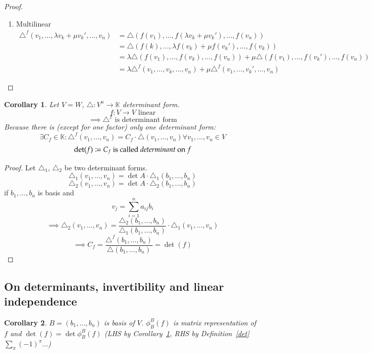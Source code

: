 \documentclass{article}
\newtheorem*{corollary}{Corollary}%
\begin{document}
\begin{proof}
  \begin{enumerate}
  	\item Multilinear
  		\begin{align*}
  		  \triangle^f (v_1, \dots, \lambda v_k + \mu v_k', \dots, v_n) &= \triangle (f(v_1), \dots, f(\lambda v_k + \mu v_k'), \dots, f(v_n)) \\
  		  	&= \triangle(f(k), \dots, \lambda f(v_k) + \mu f(v_k'), \dots, f(v_k)) \\
  		  	&= \lambda \triangle (f(v_1), \dots, f(v_k), \dots, f(v_n)) + \mu \triangle(f(v_1), \dots, f(v_k'), \dots, f(v_n)) \\
  		  	&= \lambda \triangle^f(v_1, \dots, v_k, \dots, v_n) + \mu \triangle^f (v_1, \dots, v_k', \dots, v_n)
  		\end{align*}
  \end{enumerate}
\end{proof}

\begin{corollary} %
  \label{cor726}
  Let $V = W$, $\triangle: V^n \to \mathbb K$ determinant form.
  \[ f: V \to V \text{ linear} \]
  \[ \implies \triangle^f \text{ is determinant form} \]
  Because there is (except for one factor) only one determinant form:
  \[ \exists C_f \in \mathbb K: \triangle^f(v_1, \dots, v_n) = C_f \cdot \triangle(v_1, \dots, v_n) \forall v_1,\dots,v_n \in V \]
  \[ \det(f) \coloneqq C_f \text{ is called \emph{determinant} on } f \]
\end{corollary}

\begin{proof}
  Let $\triangle_1$, $\triangle_2$ be two determinant forms.
  \[ \triangle_1 (v_1, \dots, v_n) = \det{A} \cdot \triangle_1(b_1, \dots, b_n) \]
  \[ \triangle_2 (v_1, \dots, v_n) = \det{A} \cdot \triangle_2(b_1, \dots, b_n) \]
  if $b_1, \dots, b_n$ is basis and
  \[ v_j = \sum_{i=1}^n a_{ij} b_i \]
  \[ \implies \triangle_2(v_1, \dots, v_n) = \frac{\triangle_2(b_1, \dots, b_n)}{\triangle_1(b_1, \dots, b_n)} \cdot \triangle_1(v_1, \dots, v_n) \]
  \[ \implies C_f = \frac{\triangle^f(b_1, \dots, b_n)}{\triangle (b_1, \dots, b_n)} = \det(f) \]
\end{proof}

\subsection{On determinants, invertibility and linear independence}

\begin{corollary} %
  $B = (b_1, \dots, b_n)$ is basis of $V$.
  $\phi_B^B(f)$ is matrix representation of $f$ and $\det(f) = \det\phi_B^B(f)$
  (LHS by Corollary~\ref{cor726}, RHS by Definition~\ref{det} $\sum_{\pi} (-1)^\pi \dots$)
\end{corollary}
\end{document}
